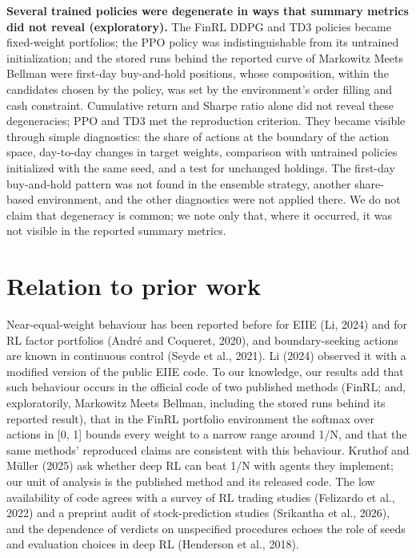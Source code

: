 \documentclass[12pt,a4paper]{report}
\begin{document}
\textbf{Several trained policies were degenerate in ways that summary
metrics did not reveal (exploratory).} The FinRL DDPG and TD3 policies
became fixed-weight portfolios; the PPO policy was indistinguishable
from its untrained initialization; and the stored runs behind the
reported curve of Markowitz Meets Bellman were first-day buy-and-hold
positions, whose composition, within the candidates chosen by the
policy, was set by the environment's order filling and cash constraint.
Cumulative return and Sharpe ratio alone did not reveal these
degeneracies; PPO and TD3 met the reproduction criterion. They became
visible through simple diagnostics: the share of actions at the boundary
of the action space, day-to-day changes in target weights, comparison
with untrained policies initialized with the same seed, and a test for
unchanged holdings. The first-day buy-and-hold pattern was not found in
the ensemble strategy, another share-based environment, and the other
diagnostics were not applied there. We do not claim that degeneracy is
common; we note only that, where it occurred, it was not visible in the
reported summary metrics.

\section{Relation to prior work}\label{relation-to-prior-work}

Near-equal-weight behaviour has been reported before for EIIE (Li, 2024)
and for RL factor portfolios (André and Coqueret, 2020), and
boundary-seeking actions are known in continuous control (Seyde et al.,
2021). Li (2024) observed it with a modified version of the public EIIE
code. To our knowledge, our results add that such behaviour occurs in
the official code of two published methods (FinRL; and, exploratorily,
Markowitz Meets Bellman, including the stored runs behind its reported
result), that in the FinRL portfolio environment the softmax over
actions in {[}0, 1{]} bounds every weight to a narrow range around 1/N,
and that the same methods' reproduced claims are consistent with this
behaviour. Kruthof and Müller (2025) ask whether deep RL can beat 1/N
with agents they implement; our unit of analysis is the published method
and its released code. The low availability of code agrees with a survey
of RL trading studies (Felizardo et al., 2022) and a preprint audit of
stock-prediction studies (Srikantha et al., 2026), and the dependence of
verdicts on unspecified procedures echoes the role of seeds and
evaluation choices in deep RL (Henderson et al., 2018).
\end{document}
